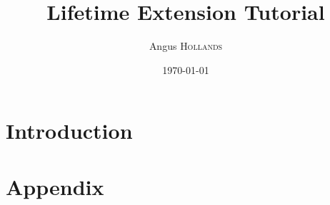 \documentclass{article}
\title{Lifetime Extension Tutorial} %
\author{Angus \textsc{Hollands}} %
\date{\today} %
\begin{document}
\maketitle %


\begin{abstract}
  
\end{abstract}

\section{Introduction}



\section{Appendix}
    
\end{document}
